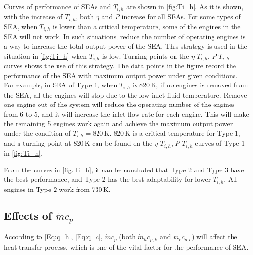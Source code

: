 Curves of performance of SEAs and $T_{i,h}$ are shown in \autoref{fig:Ti_h}.
As it is shown, with the increase of $T_{i,h}$, both $\eta$ and $P$ increase for all SEAs. For some types of SEA, when $T_{i,h}$ is lower than a critical temperature, some of the engines in the SEA will not work. In such situations, reduce the number of operating engines is a way to increase the total output power of the SEA. This strategy is used in the situation in \autoref{fig:Ti_h} when $T_{i,h}$ is low. Turning points on the $\eta$-$T_{i,h}$, $P$-$T_{i,h}$ curves shows the use of this strategy. The data points in the figure record the performance of the SEA with maximum output power under given conditions. 
For example, in SEA of Type 1, when $T_{i,h}$ is  820\,K, if no engines is removed from the SEA, all the engines will stop due to the low inlet fluid temperature. Remove one engine out of the system will reduce the operating number of the engines from 6 to 5, and it will increase the inlet flow rate for each engine. This will make the remaining 5 engines work again and achieve the maximum output power under the condition of $T_{i,h} = 820\,\mathrm{K}$. $820\,\mathrm{K}$ is a critical temperature for Type 1, and a turning point at 820\,K can be found on the $\eta$-$T_{i,h}$, $P$-$T_{i,h}$ curves of Type 1 in \autoref{fig:Ti_h}. 

From the curves in \autoref{fig:Ti_h}, it can be concluded that Type 2 and Type 3 have the best performance, and Type 2 has the best adaptability for lower $T_{i,h}$. All engines in Type 2 work from 730\,K.

\subsection{Effects of $\dot{m}c_p$}

According to \autoref{Eq:q_h}, \autoref{Eq:q_c}, $\dot{m}c_p$ (both $\dot{m}_hc_{p,h}$ and $\dot{m}_cc_{p,c}$) will affect the heat transfer process, which is one of the vital factor for the performance of SEA.


